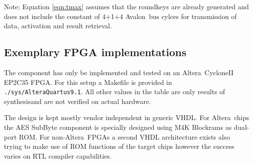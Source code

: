 \documentclass{ruschidoc}
\begin{document}
Note: Equation \ref{eqn:tmax} assumes that the roundkeys are already generated and does not include the constant of 4+1+4
Avalon\rtm\ bus cylces for transmission of data, activation and result retrieval.


\subsection{Exemplary FPGA implementations}

The component has only be implemented and tested on an Altera\rtm\ CycloneII EP2C35
FPGA. For this setup a Makefile is provided in \texttt{./sys/AlteraQuartus9.1}.  All
other values in the table are only results of synthesis\footnotemark[0] and are not
verified on actual hardware.



The design is kept mostly vendor independent in generic VHDL. For Altera\rtm\ chips the
AES SubByte component is specially designed using M4K Blockrams as dual-port ROM. For
non-Altera\rtm\ FPGAs a second VHDL architecture exists also trying to make use of
ROM functions of the target chips however the success varies on RTL compiler
capabilities.
\end{document}
